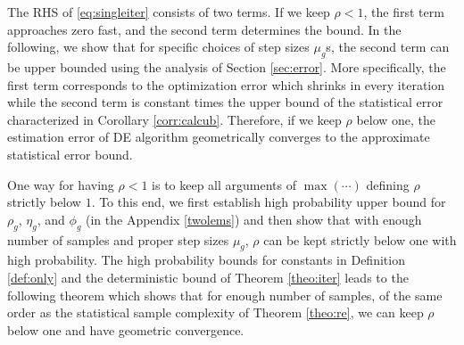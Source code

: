 The RHS of \eqref{eq:singleiter} consists of two terms.
If we keep $\rho < 1$, the first term approaches zero fast, 
and the second term determines the bound. %
In the following, we show that for specific choices of step sizes $\mu_g$s, the second term can be upper bounded using the analysis of Section \ref{sec:error}.
More specifically, the first term corresponds to the optimization error which shrinks in every iteration while the second term is constant times the upper bound of the statistical error characterized in Corollary \ref{corr:calcub}.
Therefore, if we keep $\rho$ below one, the estimation error of DE algorithm geometrically converges to the approximate statistical error bound. %

One way for having $\rho < 1$ is to keep all arguments of $\max(\cdots)$  defining $\rho$ strictly below $1$. %
To this end, we first establish high probability upper bound for $\rho_g$, $\eta_g$, and $\phi_g$ (in the Appendix \ref{twolems}) and then show that with enough number of samples and proper step sizes $\mu_g$, $\rho$ can be kept strictly below one with high probability. %
The high probability bounds for constants in Definition \ref{def:only} and the deterministic bound of Theorem \ref{theo:iter} leads to the following theorem which shows that for enough number of samples, of the same order as the statistical sample complexity of Theorem \ref{theo:re}, we can keep $\rho$ below one and have geometric convergence.






